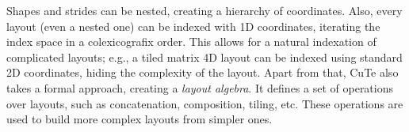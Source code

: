 Shapes and strides can be nested, creating a hierarchy of coordinates. Also, every layout (even a nested one) can be indexed with 1D coordinates, iterating the index space in a colexicografix order. This allows for a natural indexation of complicated layouts; e.g., a tiled matrix 4D layout can be indexed using standard 2D coordinates, hiding the complexity of the layout. 
Apart from that, CuTe also takes a formal approach, creating a \emph{layout algebra}. It defines a set of operations over layouts, such as concatenation, composition, tiling, etc. These operations are used to build more complex layouts from simpler ones.







